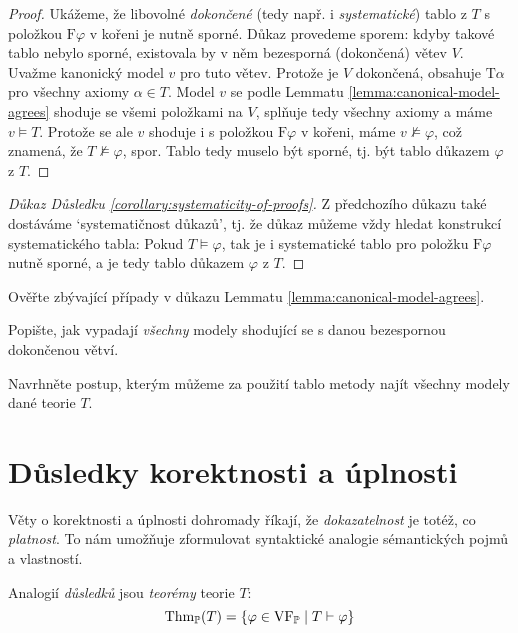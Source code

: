 \begin{proof}
Ukážeme, že libovolné \emph{dokončené} (tedy např. i \emph{systematické}) tablo z $T$ s položkou $\mathrm{F}\varphi$ v kořeni je nutně sporné. Důkaz provedeme sporem: kdyby takové tablo nebylo sporné, existovala by v něm bezesporná (dokončená) větev $V$. Uvažme kanonický model $v$ pro tuto větev. Protože je $V$ dokončená, obsahuje $\mathrm{T}\alpha$ pro všechny axiomy $\alpha\in T$. Model $v$ se podle Lemmatu \ref{lemma:canonical-model-agrees} shoduje se všemi položkami na $V$, splňuje tedy všechny axiomy a máme $v\models T$. Protože se ale $v$ shoduje i s položkou $\mathrm{F}\varphi$ v kořeni, máme $v\not\models\varphi$, což znamená, že $T\not\models\varphi$, spor. Tablo tedy muselo být sporné, tj. být tablo důkazem $\varphi$ z $T$.
\end{proof}

\begin{proof}[Důkaz Důsledku \ref{corollary:systematicity-of-proofs}]
Z předchozího důkazu také dostáváme `systematičnost důkazů', tj. že důkaz můžeme vždy hledat konstrukcí systematického tabla: Pokud $T\models\varphi$, tak je i systematické tablo pro položku $\mathrm{F}\varphi$ nutně sporné, a je tedy tablo důkazem $\varphi$ z $T$.
\end{proof}

\begin{exercise}
    Ověřte zbývající případy v důkazu Lemmatu \ref{lemma:canonical-model-agrees}.
\end{exercise}

\begin{exercise}
    Popište, jak vypadají \emph{všechny} modely shodující se s danou bezespornou dokončenou větví.
\end{exercise}

\begin{exercise}
    Navrhněte postup, kterým můžeme za použití tablo metody najít všechny modely dané teorie $T$.
\end{exercise}


\section{Důsledky korektnosti a úplnosti}

Věty o korektnosti a úplnosti dohromady říkají, že \emph{dokazatelnost} je totéž, co \emph{platnost}. To nám umožňuje zformulovat syntaktické analogie sémantických pojmů a vlastností.

Analogií \emph{důsledků} jsou \emph{teorémy} teorie $T$:
$$
\operatorname{Thm}_\mathbb P(T)=\{\varphi\in\operatorname{VF}_\mathbb P\mid T\vdash\varphi\}
$$

